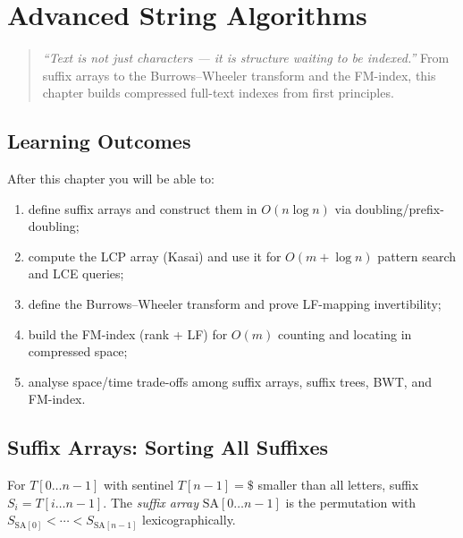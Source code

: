 \chapter{Advanced String Algorithms}
\label{ch:string-adv}

\begin{quote}
\emph{``Text is not just characters --- it is structure waiting to be indexed.''}
From suffix arrays to the Burrows--Wheeler transform and the FM-index, this chapter builds compressed full-text indexes from first principles.
\end{quote}

\noindent{}
\vspace{0.4em}

\section*{Learning Outcomes}
After this chapter you will be able to:
\begin{enumerate}[label=(L\arabic*)]
    \item define suffix arrays and construct them in $O(n\log n)$ via doubling/prefix-doubling;
    \item compute the LCP array (Kasai) and use it for $O(m+\log n)$ pattern search and LCE queries;
    \item define the Burrows--Wheeler transform and prove LF-mapping invertibility;
    \item build the FM-index (rank + LF) for $O(m)$ counting and locating in compressed space;
    \item analyse space/time trade-offs among suffix arrays, suffix trees, BWT, and FM-index.
\end{enumerate}

\section{Suffix Arrays: Sorting All Suffixes}
\label{sec:suffix-array}

For $T[0\ldots n-1]$ with sentinel $T[n-1]=\$$ smaller than all letters, suffix $S_i=T[i\ldots n-1]$. The \emph{suffix array} $\text{SA}[0\ldots n-1]$ is the permutation with $S_{\text{SA}[0]}<\cdots<S_{\text{SA}[n-1]}$ lexicographically.


